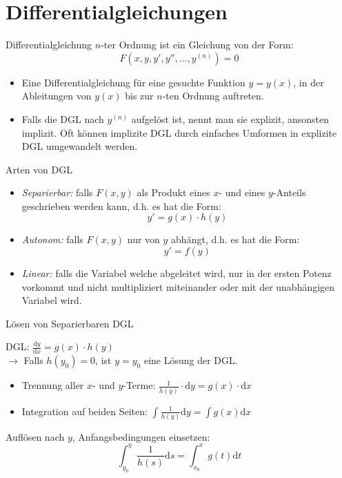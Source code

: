 \section{Differentialgleichungen}

\begin{definition}{Differentialgleichung}
  \(n\)-ter Ordnung ist ein Gleichung von der Form:
      \[F(x,y,y',y'',\ldots,y^{(n)})=0\]
  \begin{itemize}
    \item Eine Differentialgleichung 
      für eine gesuchte Funktion \(y=y(x)\), in der Ableitungen von \(y(x)\) bis zur \(n\)-ten Ordnung auftreten.
    \item Falls die DGL nach \(y^{(n)}\) aufgelöst ist, nennt man sie explizit, ansonsten implizit.
      Oft können implizite DGL durch einfaches Umformen in explizite DGL umgewandelt werden.
  \end{itemize}
\end{definition}

\begin{definition}{Arten von DGL}
  \begin{itemize}
    \item \emph{Separierbar:} falls \(F(x,y)\) als Produkt eines \(x\)- und eines \(y\)-Anteils geschrieben
      werden kann, d.h. es hat die Form:
      \[y'=g(x)\cdot h(y)\]
    \item \emph{Autonom:} falls \(F(x,y)\) nur von \(y\) abhängt, d.h. es hat die Form:
      \[y'=f(y)\]
    \item \emph{Linear:} falls die Variabel welche abgeleitet wird, nur in der ersten Potenz vorkommt und nicht
      multipliziert miteinander oder mit der unabhängigen Variabel wird.
  \end{itemize}
\end{definition}

\begin{KR}{Lösen von Separierbaren DGL}
  \begin{center}
    DGL:
      $\frac{\mathrm{d}y}{\mathrm{d}x}=g(x)\cdot h(y)$\\
      \vspace{1mm}
      $\rightarrow$ Falls \(h(y_0)=0\), ist \(y=y_0\) eine Lösung der DGL.
  \end{center}
  \begin{itemize}
    \item Trennung aller \(x\)- und \(y\)-Terme:
    $\frac{1}{h(y)}\cdot \mathrm{d}y=g(x)\cdot \mathrm{d}x$
    \item Integration auf beiden Seiten:
    $\int{\frac{1}{h(y)}\mathrm{d}y}=\int{g(x)\mathrm{d}x}$
    \end{itemize}
  Auflösen nach \(y\), Anfangsbedingungen einsetzen:
      \[\int_{y_0}^{y}{\frac{1}{h(s)}\mathrm{d}s}=\int_{x_0}^{x}{g(t)\mathrm{d}t}\]
\end{KR}

